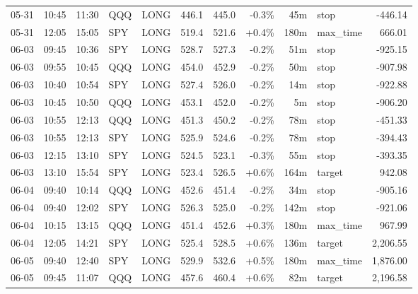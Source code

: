\documentclass[11pt,a4paper,twoside]{article}
\begin{document}
\begin{center}
\begin{longtable}{>{\color{txtmain}}l l l l l r r r r >{\color{txtmain}}l r}
05-31 & 10:45 & 11:30 & QQQ & LONG & 446.1 & 445.0 & \textcolor{lossred}{-0.3\%} & 45m & stop & \textcolor{lossred}{-446.14} \\
05-31 & 12:05 & 15:05 & SPY & LONG & 519.4 & 521.6 & \textcolor{wingreen}{+0.4\%} & 180m & max\_time & \textcolor{wingreen}{666.01} \\
06-03 & 09:45 & 10:36 & SPY & LONG & 528.7 & 527.3 & \textcolor{lossred}{-0.2\%} & 51m & stop & \textcolor{lossred}{-925.15} \\
06-03 & 09:55 & 10:45 & QQQ & LONG & 454.0 & 452.9 & \textcolor{lossred}{-0.2\%} & 50m & stop & \textcolor{lossred}{-907.98} \\
06-03 & 10:40 & 10:54 & SPY & LONG & 527.4 & 526.0 & \textcolor{lossred}{-0.2\%} & 14m & stop & \textcolor{lossred}{-922.88} \\
06-03 & 10:45 & 10:50 & QQQ & LONG & 453.1 & 452.0 & \textcolor{lossred}{-0.2\%} & 5m & stop & \textcolor{lossred}{-906.20} \\
06-03 & 10:55 & 12:13 & QQQ & LONG & 451.3 & 450.2 & \textcolor{lossred}{-0.2\%} & 78m & stop & \textcolor{lossred}{-451.33} \\
06-03 & 10:55 & 12:13 & SPY & LONG & 525.9 & 524.6 & \textcolor{lossred}{-0.2\%} & 78m & stop & \textcolor{lossred}{-394.43} \\
06-03 & 12:15 & 13:10 & SPY & LONG & 524.5 & 523.1 & \textcolor{lossred}{-0.3\%} & 55m & stop & \textcolor{lossred}{-393.35} \\
06-03 & 13:10 & 15:54 & SPY & LONG & 523.4 & 526.5 & \textcolor{wingreen}{+0.6\%} & 164m & target & \textcolor{wingreen}{942.08} \\
06-04 & 09:40 & 10:14 & QQQ & LONG & 452.6 & 451.4 & \textcolor{lossred}{-0.2\%} & 34m & stop & \textcolor{lossred}{-905.16} \\
06-04 & 09:40 & 12:02 & SPY & LONG & 526.3 & 525.0 & \textcolor{lossred}{-0.2\%} & 142m & stop & \textcolor{lossred}{-921.06} \\
06-04 & 10:15 & 13:15 & QQQ & LONG & 451.4 & 452.6 & \textcolor{wingreen}{+0.3\%} & 180m & max\_time & \textcolor{wingreen}{967.99} \\
06-04 & 12:05 & 14:21 & SPY & LONG & 525.4 & 528.5 & \textcolor{wingreen}{+0.6\%} & 136m & target & \textcolor{wingreen}{2,206.55} \\
06-05 & 09:40 & 12:40 & SPY & LONG & 529.9 & 532.6 & \textcolor{wingreen}{+0.5\%} & 180m & max\_time & \textcolor{wingreen}{1,876.00} \\
06-05 & 09:45 & 11:07 & QQQ & LONG & 457.6 & 460.4 & \textcolor{wingreen}{+0.6\%} & 82m & target & \textcolor{wingreen}{2,196.58} \\

\end{longtable}
\end{center}
\end{document}
